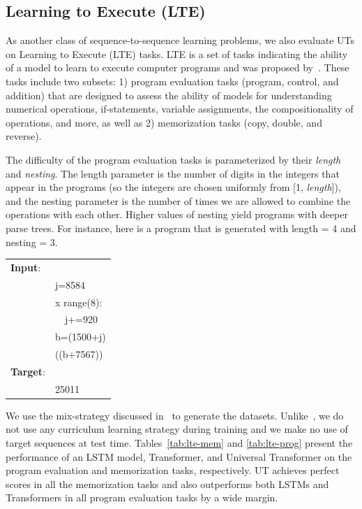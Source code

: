 

\subsection{Learning to Execute (LTE)}
As another class of sequence-to-sequence learning problems, we also evaluate UTs on Learning to Execute (LTE) tasks. 
LTE is a set of tasks indicating the ability of a model to learn to execute computer programs and was proposed by~\citet{ZS14}. These tasks include two subsets: 1) program evaluation tasks (program, control, and addition) that are designed to assess the ability of models for understanding numerical operations, if-statements, variable assignments, the compositionality of operations, and more, as well as 2) memorization tasks (copy, double, and reverse). 

The difficulty of the program evaluation tasks is parameterized by their \textit{length} and \textit{nesting}. The
length parameter is the number of digits in the integers that appear in the programs (so the integers are chosen uniformly from [1, \emph{length}]), and the nesting parameter is the number of times we are allowed to combine the operations with each
other. Higher values of nesting yield programs with deeper parse trees.
For instance, here is a program that is generated with length = 4 and
nesting = 3. 
\begin{table}[h!]
\fontsize{8}{8}\selectfont
\begin{tabular}{l l}
\textbf{Input}: & \\
& j=8584 \\
& {\color{blue}{for}} x {\color{blue}{in}} range(8): \\
& ~~j+=920 \\
& b=(1500+j) \\
& {\color{blue}{print}}((b+7567)) \\
\textbf{Target}: & \\
& 25011
\end{tabular}
\end{table}



We use the mix-strategy discussed in~\citep{ZS14} to generate the datasets. Unlike~\citep{ZS14}, we do not use any curriculum learning strategy during training and we make no use of target sequences at test time. Tables~\ref{tab:lte-mem} and \ref{tab:lte-prog} present the performance of an LSTM model, Transformer, and Universal Transformer on the program evaluation and memorization tasks, respectively. UT achieves perfect scores in all the memorization tasks and also outperforms both LSTMs and Transformers in all program evaluation tasks by a wide margin. 



